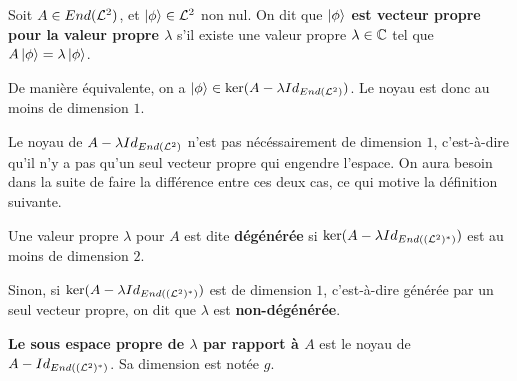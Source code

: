 \begin{definition} 
	Soit $A \in End(\mathcal{L}^{2})$, et $\ket{\phi} \in \mathcal{L}^{2}$ non nul. On
	dit que \textbf{$\ket{\phi}$ est vecteur propre pour la valeur propre
	$\lambda$} s'il existe une valeur propre $\lambda \in \mathbb{C}$ tel que $A
	\ket{\phi} = \lambda \ket{\phi}$.

	De manière équivalente, on a $\ket{\phi} \in \ker(A - \lambda
	Id_{End(\mathcal{L}^{2})})$. Le noyau est donc au moins de dimension $1$.
\end{definition}

Le noyau de $A - \lambda Id_{End(\mathcal{L}^{2})}$ n'est pas nécéssairement
de dimension $1$, c'est-à-dire qu'il n'y a pas qu'un seul vecteur propre qui
engendre l'espace. On aura besoin dans la suite de faire la différence entre ces
deux cas, ce qui motive la définition suivante.

\begin{definition} [Dégénérescence]
	Une valeur propre $\lambda$ pour $A$ est dite \textbf{dégénérée} si $\ker(A
	- \lambda Id_{End((\mathcal{L}^{2})^{*})})$ est au moins de dimension
	$2$.

	Sinon, si $\ker(A - \lambda Id_{End((\mathcal{L}^{2})^{*})})$ est de
	dimension $1$, c'est-à-dire générée par un seul vecteur propre, on dit que
	$\lambda$ est \textbf{non-dégénérée}.
\end{definition}

\begin{definition} 
	\textbf{Le sous espace propre de $\lambda$ par rapport à $A$} est le noyau
	de $A - Id_{End((\mathcal{L}^{2})^{*})}$.
	Sa dimension est notée $g$.
\end{definition}
